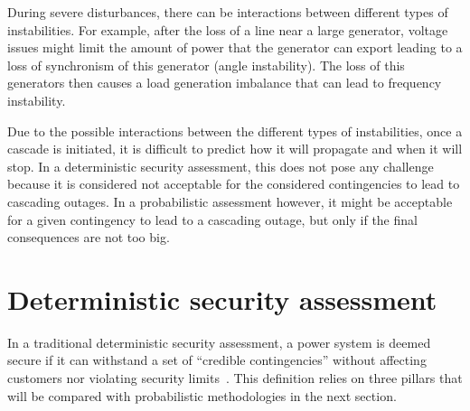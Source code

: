 During severe disturbances, there can be interactions between different types of instabilities. For example, after the loss of a line near a large generator, voltage issues might limit the amount of power that the generator can export leading to a loss of synchronism of this generator (angle instability). The loss of this generators then causes a load generation imbalance that can lead to frequency instability.


Due to the possible interactions between the different types of instabilities, once a cascade is initiated, it is difficult to predict how it will propagate and when it will stop. In a deterministic security assessment, this does not pose any challenge because it is considered not acceptable for the considered contingencies to lead to cascading outages. In a probabilistic assessment however, it might be acceptable for a given contingency to lead to a cascading outage, but only if the final consequences are not too big.


\section{Deterministic security assessment}
\label{sec:traditionalSecurity}

In a traditional deterministic security assessment, a power system is deemed secure if it can withstand a set of ``credible contingencies'' without affecting customers nor violating security limits~\cite{N-1-ENTSOE}. This definition relies on three pillars that will be compared with probabilistic methodologies in the next section.

